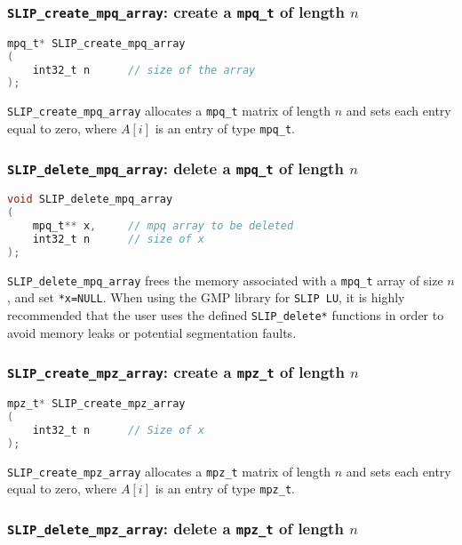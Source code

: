 \documentclass[12pt]{article}
\theoremstyle{definition}
\begin{document}
\cprotect\subsubsection{\verb|SLIP_create_mpq_array|: create a \verb|mpq_t| of length $n$}


\begin{lstlisting}[language=C,frame=single]
mpq_t* SLIP_create_mpq_array
(
    int32_t n      // size of the array
);
\end{lstlisting}

\verb|SLIP_create_mpq_array| allocates a \verb|mpq_t| matrix of length $n$ and sets each entry equal to zero, where  $A[i]$ is an entry of type \verb|mpq_t|.

\cprotect\subsubsection{\verb|SLIP_delete_mpq_array|: delete a \verb|mpq_t| of length $n$}


\begin{lstlisting}[language=C,frame=single]
void SLIP_delete_mpq_array
(
    mpq_t** x,     // mpq array to be deleted
    int32_t n      // size of x
);
\end{lstlisting}

\verb|SLIP_delete_mpq_array| frees the memory associated with a \verb|mpq_t| array of size $n$, and set \verb|*x=NULL|. When using the GMP library for \verb|SLIP LU|, it is highly recommended that the user uses the defined \verb|SLIP_delete*| functions in order to avoid memory leaks or potential segmentation faults.

\cprotect\subsubsection{\verb|SLIP_create_mpz_array|: create a \verb|mpz_t| of length $n$} \label{ss:create_mpz_array}


\begin{lstlisting}[language=C,frame=single]
mpz_t* SLIP_create_mpz_array
(
    int32_t n      // Size of x
);

\end{lstlisting}

\verb|SLIP_create_mpz_array| allocates a \verb|mpz_t| matrix of length $n$ and sets each entry equal to zero, where  $A[i]$ is an entry of type \verb|mpz_t|.

\cprotect\subsubsection{\verb|SLIP_delete_mpz_array|: delete a \verb|mpz_t| of length $n$}
\end{document}
